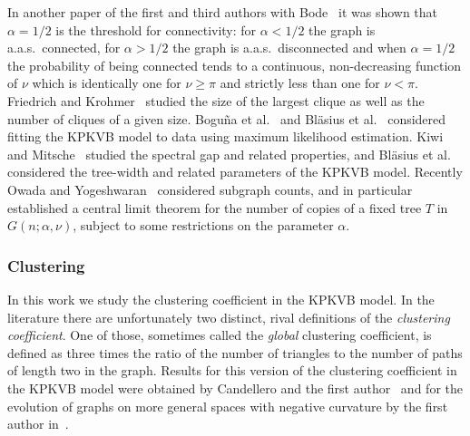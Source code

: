In another paper of the first and third authors with Bode~\cite{bode2016probability} it was shown that $\alpha=1/2$ is the threshold for connectivity: for $\alpha < 1/2$ the graph is a.a.s.~connected, for $\alpha>1/2$ the graph is a.a.s.~disconnected and when $\alpha=1/2$ the probability of being connected tends to a continuous, non-decreasing function of $\nu$ which is identically one for $\nu \geq \pi$ and strictly less than one for $\nu < \pi$. Friedrich and Krohmer~\cite{blasius2018cliques} studied the size of the largest clique as well as the number of cliques of a given size. Bogu\~{n}a et al.~\cite{boguna2010sustaining} and Bl\"asius et al.~\cite{blasius2018efficient} considered fitting the KPKVB model to data using maximum likelihood estimation. Kiwi and Mitsche~\cite{kiwi2018spectral} studied the spectral gap and related properties, and Bl\"asius et al.\cite{blasius2016hyperbolic} considered the tree-width and related parameters of the KPKVB model. Recently Owada and Yogeshwaran~\cite{owada2018sub} considered subgraph counts, and in particular established a central limit theorem for the number of copies of a fixed tree $T$ in $G(n;\alpha,\nu)$, subject to some restrictions on the parameter $\alpha$.

\subsubsection*{Clustering}

In this work we study the clustering coefficient in the KPKVB model. In the literature there are unfortunately two distinct, rival definitions of the {\em clustering coefficient}. One of those, sometimes called the {\em global} clustering coefficient, is defined as three times the ratio of the number of triangles to the number of paths of length two in the graph. Results for this version of the clustering coefficient in the KPKVB model were obtained by Candellero and the first author~\cite{candellero2016clustering} and for the evolution of graphs on more general spaces with negative curvature by the first author in~\cite{fountoulakis2012evolution}. 

